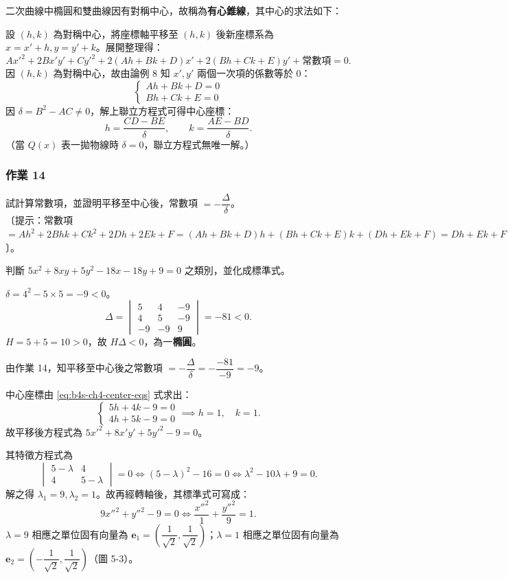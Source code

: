 二次曲線中橢圓和雙曲線因有對稱中心，故稱為\textbf{有心錐線}，其中心的求法如下：

設 $(h, k)$ 為對稱中心，將座標軸平移至 $(h, k)$ 後新座標系為 $x = x' + h, y = y' + k$。展開整理得：
\[
Ax'^2 + 2Bx'y' + Cy'^2 + 2(Ah + Bk + D)x' + 2(Bh + Ck + E)y' + \text{常數項} = 0.
\]
因 $(h, k)$ 為對稱中心，故由論例 8 知 $x', y'$ 兩個一次項的係數等於 0：
\begin{equation}
\begin{cases}
Ah + Bk + D = 0 \\
Bh + Ck + E = 0
\end{cases}
\label{eq:b4s-ch4-center-eqs}
\end{equation}
因 $\delta = B^2 - AC \ne 0$，解上聯立方程式可得中心座標：
\[
h = \frac{CD - BE}{\delta}, \qquad k = \frac{AE - BD}{\delta}.
\]
（當 $Q(x)$ 表一拋物線時 $\delta = 0$，聯立方程式無唯一解。）

\subsubsection*{作業 14}
試計算常數項，並證明平移至中心後，常數項 $= -\dfrac{\Delta}{\delta}$。\\
〔提示：常數項 $= Ah^2 + 2Bhk + Ck^2 + 2Dh + 2Ek + F = (Ah+Bk+D)h + (Bh+Ck+E)k + (Dh+Ek+F) = Dh + Ek + F$〕。

\begin{example}
判斷 $5x^2 + 8xy + 5y^2 - 18x - 18y + 9 = 0$ 之類別，並化成標準式。
\end{example}

\begin{solution}
$\delta = 4^2 - 5 \times 5 = -9 < 0$。
\[
\Delta = \begin{vmatrix} 5 & 4 & -9 \\ 4 & 5 & -9 \\ -9 & -9 & 9 \end{vmatrix} = -81 < 0.
\]
$H = 5 + 5 = 10 > 0$，故 $H\Delta < 0$，為一\textbf{橢圓}。

由作業 14，知平移至中心後之常數項 $= -\dfrac{\Delta}{\delta} = -\dfrac{-81}{-9} = -9$。

中心座標由 \eqref{eq:b4s-ch4-center-eqs} 式求出：
\[
\begin{cases}
5h + 4k - 9 = 0 \\
4h + 5k - 9 = 0
\end{cases}
\implies h = 1, \quad k = 1.
\]
故平移後方程式為 $5{x'}^2 + 8x'y' + 5{y'}^2 - 9 = 0$。

其特徵方程式為
\[
\begin{vmatrix} 5 - \lambda & 4 \\ 4 & 5 - \lambda \end{vmatrix} = 0 \iff (5 - \lambda)^2 - 16 = 0 \iff \lambda^2 - 10\lambda + 9 = 0.
\]
解之得 $\lambda_1 = 9, \lambda_2 = 1$。故再經轉軸後，其標準式可寫成：
\[
9{x''}^2 + {y''}^2 - 9 = 0 \iff \frac{{x''}^2}{1} + \frac{{y''}^2}{9} = 1.
\]
$\lambda = 9$ 相應之單位固有向量為 $\mathbf{e}_1 = \left(\dfrac{1}{\sqrt{2}}, \dfrac{1}{\sqrt{2}}\right)$；$\lambda = 1$ 相應之單位固有向量為 $\mathbf{e}_2 = \left(-\dfrac{1}{\sqrt{2}}, \dfrac{1}{\sqrt{2}}\right)$（圖 5-3）。
\end{solution}

